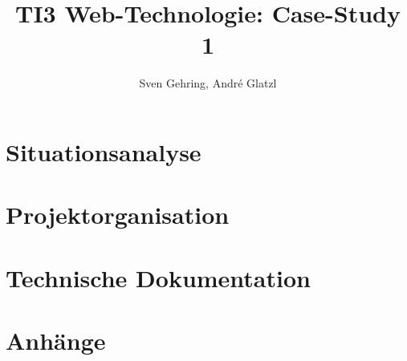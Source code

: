 \documentclass{article}
\begin{document}

\title{\vspace{-2cm}TI3 Web-Technologie: Case-Study 1}
\author{Sven Gehring, André Glatzl}
\date{}
\maketitle

\begin{abstract}

\end{abstract}

\tableofcontents

\clearpage
\section{Situationsanalyse}









\clearpage
\section{Projektorganisation}



\clearpage
\section{Technische Dokumentation}


\clearpage


\clearpage
\section{Anhänge}


\end{document}
